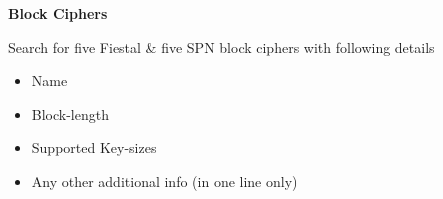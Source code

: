\documentclass[10pt, a4paper]{article}
\begin{document}
\newpage
\begin{Problem}

\textbf{Block Ciphers}

Search for five Fiestal & five SPN block ciphers with following details

\begin{itemize}
    \item Name
    \item Block-length
    \item Supported Key-sizes
    \item Any other additional info (in one line only)
\end{itemize}

\end{Problem}
\end{document}
